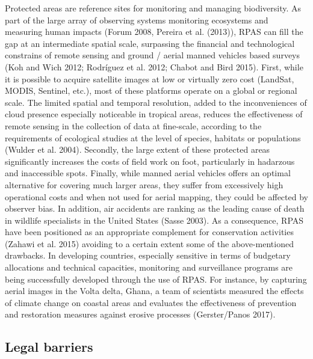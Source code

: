\documentclass[]{interact}
\theoremstyle{plain}%
\theoremstyle{definition}
\theoremstyle{remark}
\begin{document}
Protected areas are reference sites for monitoring and managing
biodiversity. As part of the large array of observing systems monitoring
ecosystems and measuring human impacts (Forum 2008, Pereira et al.
(2013)), RPAS can fill the gap at an intermediate spatial scale,
surpassing the financial and technological constrains of remote sensing
and ground / aerial manned vehicles based surveys (Koh and Wich 2012;
Rodríguez et al. 2012; Chabot and Bird 2015). First, while it is
possible to acquire satellite images at low or virtually zero cost
(LandSat, MODIS, Sentinel, etc.), most of these platforms operate on a
global or regional scale. The limited spatial and temporal resolution,
added to the inconveniences of cloud presence especially noticeable in
tropical areas, reduces the effectiveness of remote sensing in the
collection of data at fine-scale, according to the requirements of
ecological studies at the level of species, habitats or populations
(Wulder et al. 2004). Secondly, the large extent of these protected
areas significantly increases the costs of field work on foot,
particularly in hadarzous and inaccessible spots. Finally, while manned
aerial vehicles offers an optimal alternative for covering much larger
areas, they suffer from excessively high operational costs and when not
used for aerial mapping, they could be affected by observer bias. In
addition, air accidents are ranking as the leading cause of death in
wildlife specialists in the United States (Sasse 2003). As a
consequence, RPAS have been positioned as an appropriate complement for
conservation activities (Zahawi et al. 2015) avoiding to a certain
extent some of the above-mentioned drawbacks. In developing countries,
especially sensitive in terms of budgetary allocations and technical
capacities, monitoring and surveillance programs are being successfully
developed through the use of RPAS. For instance, by capturing aerial
images in the Volta delta, Ghana, a team of scientists measured the
effects of climate change on coastal areas and evaluates the
effectiveness of prevention and restoration measures against erosive
processes (Gerster/Panos 2017).

\subsection{Legal barriers}\label{legal-barriers}
\end{document}

